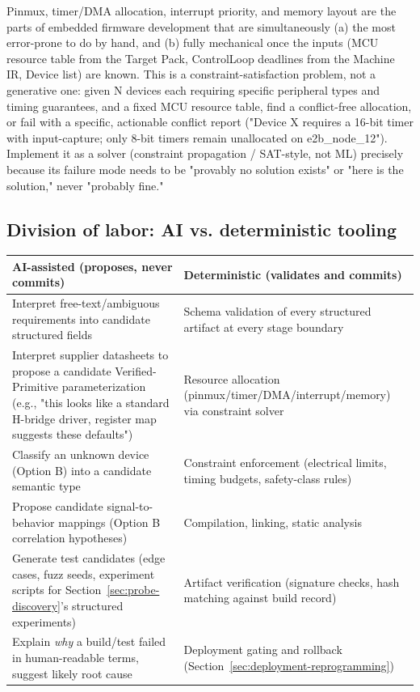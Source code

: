 Pinmux, timer/DMA allocation, interrupt priority, and memory layout are the parts of embedded firmware development that are simultaneously (a) the most error-prone to do by hand, and (b) fully mechanical once the inputs (MCU resource table from the Target Pack, ControlLoop deadlines from the Machine IR, Device list) are known. This is a constraint-satisfaction problem, not a generative one: given N devices each requiring specific peripheral types and timing guarantees, and a fixed MCU resource table, find a conflict-free allocation, or fail with a specific, actionable conflict report ("Device X requires a 16-bit timer with input-capture; only 8-bit timers remain unallocated on e2b\_node\_12"). Implement it as a solver (constraint propagation / SAT-style, not ML) precisely because its failure mode needs to be "provably no solution exists" or "here is the solution," never "probably fine."

\subsection{Division of labor: AI vs. deterministic tooling}

\begin{center}
\small
\begin{tabularx}{\linewidth}{@{}X X@{}}
\toprule
\textbf{AI-assisted (proposes, never commits)} & \textbf{Deterministic (validates and commits)} \\
\midrule
Interpret free-text/ambiguous requirements into candidate structured fields & Schema validation of every structured artifact at every stage boundary \\
Interpret supplier datasheets to propose a candidate Verified-Primitive parameterization (e.g., "this looks like a standard H-bridge driver, register map suggests these defaults") & Resource allocation (pinmux/timer/DMA/interrupt/memory) via constraint solver \\
Classify an unknown device (Option B) into a candidate semantic type & Constraint enforcement (electrical limits, timing budgets, safety-class rules) \\
Propose candidate signal-to-behavior mappings (Option B correlation hypotheses) & Compilation, linking, static analysis \\
Generate test candidates (edge cases, fuzz seeds, experiment scripts for Section~\ref{sec:probe-discovery}'s structured experiments) & Artifact verification (signature checks, hash matching against build record) \\
Explain \emph{why} a build/test failed in human-readable terms, suggest likely root cause & Deployment gating and rollback (Section~\ref{sec:deployment-reprogramming}) \\
\bottomrule
\end{tabularx}
\end{center}

